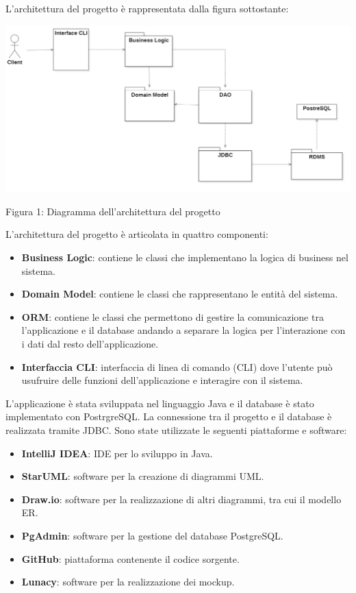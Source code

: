 \documentclass[10pt]{article}
\begin{document}
L'architettura del progetto è rappresentata dalla figura sottostante: 
\begin{center}
\hspace*{-1cm}
\includegraphics[scale=0.175]{Sp/Architettura}
\par\medskip
Figura 1: Diagramma dell'architettura del progetto
\par\medskip
\end{center}
L'architettura del progetto è articolata in quattro componenti:
\begin{itemize}
	\item \textbf{Business Logic}: contiene le classi che implementano la logica di business nel sistema.
	\item \textbf{Domain Model}: contiene le classi che rappresentano le entità del sistema.
	\item \textbf{ORM}: contiene le classi che permettono di gestire la comunicazione tra l'applicazione e il database andando a separare la logica per l'interazione con i dati dal resto dell'applicazione.
        \item \textbf{Interfaccia CLI}: interfaccia di linea di comando (CLI) dove l'utente può usufruire delle funzioni dell'applicazione e interagire con il sistema.
\end{itemize}
L'applicazione è stata sviluppata nel linguaggio Java e il database è stato implementato con PostrgreSQL. La connessione tra il progetto e il database è realizzata tramite JDBC. 
Sono state utilizzate le seguenti piattaforme e software:
\begin{itemize}
\item \textbf{IntelliJ IDEA}: IDE per lo sviluppo in Java.
\item \textbf{StarUML}: software per la creazione di diagrammi UML.
\item \textbf{Draw.io}: software per la realizzazione di altri diagrammi, tra cui il modello ER.
\item \textbf{PgAdmin}: software per la gestione del database PostgreSQL.
\item \textbf{GitHub}: piattaforma contenente il codice sorgente.
\item \textbf{Lunacy}: software per la realizzazione dei mockup.
\end{itemize}
\end{document}
